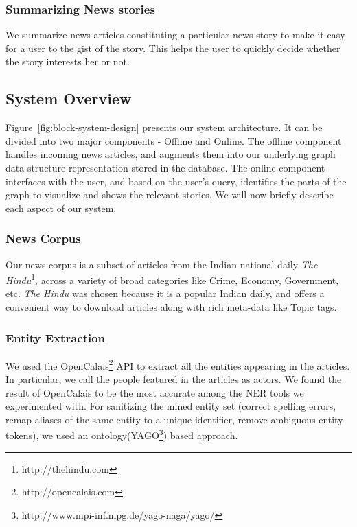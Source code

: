 \subsubsection{Summarizing News stories}
We summarize news articles constituting a particular news story to make it easy for a user to the gist of the story. This helps the user to quickly decide whether the story interests her or not.

\subsection{System Overview}
Figure~\ref{fig:block-system-design} presents our system architecture. It can be divided into
two major components - Offline and Online. The offline component handles incoming news articles, and augments them into our underlying graph data structure representation stored
in the database. The online component interfaces with the user, and based on the user's query, identifies the parts of the graph to visualize and 
shows the relevant stories. We will now briefly describe each aspect of our system.

\subsubsection*{News Corpus}
Our news corpus is a subset of articles from the Indian national daily {\em The Hindu}\footnote{http://thehindu.com}, across a variety of broad categories like Crime, Economy, Government, etc. 
{\em The Hindu} was chosen because it is a popular Indian daily, and offers a convenient way to download articles along with rich meta-data like Topic tags.

\subsubsection*{Entity Extraction}
We used the OpenCalais\footnote{http://opencalais.com} API to extract all the entities appearing in the articles. In particular, we call
the people featured in the articles as actors. We found the result of OpenCalais to be the most accurate among the NER tools we experimented with.
For sanitizing the mined entity set (correct spelling errors, remap aliases of the same entity to a unique identifier, remove ambiguous entity tokens),
we used an ontology(YAGO\footnote{http://www.mpi-inf.mpg.de/yago-naga/yago/}) based approach.

